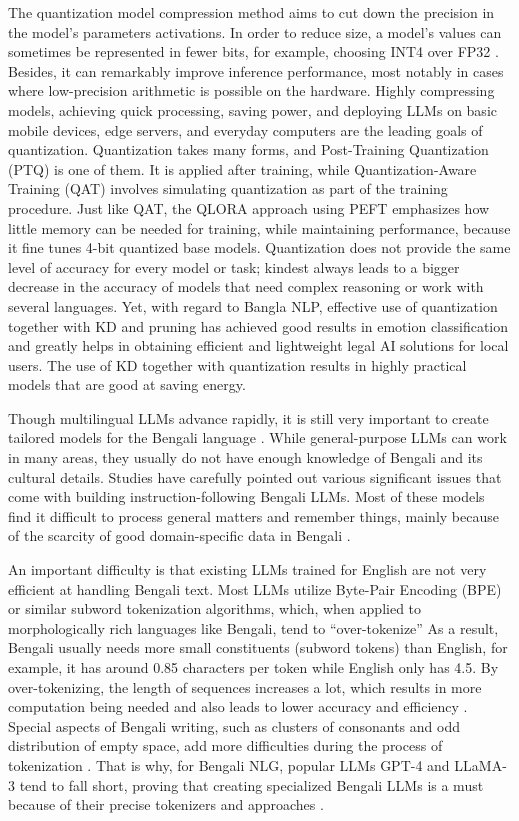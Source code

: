 The quantization model compression method aims to cut down the precision in the model’s parameters  activations. In order to reduce size, a model’s values can sometimes be represented in fewer bits, for example, choosing INT4 over FP32 . Besides, it can remarkably improve inference performance, most notably in cases where low-precision arithmetic is possible on the hardware. Highly compressing models, achieving quick processing, saving power, and deploying LLMs on basic mobile devices, edge servers, and everyday computers are the leading goals of quantization. Quantization takes many forms, and Post-Training Quantization (PTQ) is one of them. It is applied after training, while Quantization-Aware Training (QAT) involves simulating quantization as part of the training procedure. Just like QAT, the QLORA approach using PEFT emphasizes how little memory can be needed for training, while maintaining performance, because it fine tunes 4-bit quantized base models. Quantization does not provide the same level of accuracy for every model or task; kindest always leads to a bigger decrease in the accuracy of models that need complex reasoning or work with several languages. Yet, with regard to Bangla NLP, effective use of quantization together with KD and pruning has achieved good results in emotion classification and greatly helps in obtaining efficient and lightweight legal AI solutions for local users. The use of KD together with quantization results in highly practical models that are good at saving energy.

Though multilingual LLMs advance rapidly, it is still very important to create tailored models for the Bengali language \cite{mahfuz2024latetrainearlyuse}. While general-purpose LLMs can work in many areas, they usually do not have enough knowledge of Bengali and its cultural details. Studies have carefully pointed out various significant issues that come with building instruction-following Bengali LLMs. Most of these models find it difficult to process general matters and remember things, mainly because of the scarcity of good domain-specific data in Bengali \cite{mahfuz2024latetrainearlyuse}\cite{khan2025efficienteducationalchatbotsbenchmarking}.

An important difficulty is that existing LLMs trained for English are not very efficient at handling Bengali text. Most LLMs utilize Byte-Pair Encoding (BPE) or similar subword tokenization algorithms, which, when applied to morphologically rich languages like Bengali, tend to ``over-tokenize'' As a result, Bengali usually needs more small constituents (subword tokens) than English, for example, it has around 0.85 characters per token while English only has 4.5. By over-tokenizing, the length of sequences increases a lot, which results in more computation being needed and also leads to lower accuracy and efficiency \cite{mahfuz2024latetrainearlyuse}. Special aspects of Bengali writing, such as clusters of consonants and odd distribution of empty space, add more difficulties during the process of tokenization . That is why, for Bengali NLG, popular LLMs GPT-4 and LLaMA-3 tend to fall short, proving that creating specialized Bengali LLMs is a must because of their precise tokenizers and approaches \cite{mahfuz2024latetrainearlyuse}\cite{unknown}.

